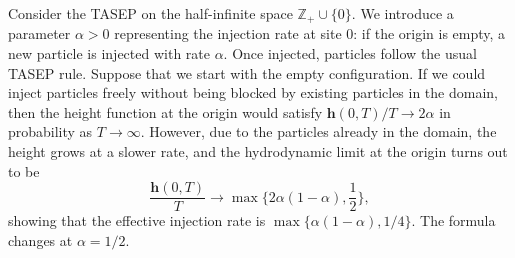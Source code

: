 \documentclass[10pt]{article}
\theoremstyle{plain}
\theoremstyle{definition}
\newcommand{\beqq}{ \begin{equation*} }
\newcommand{\eeqq}{ \end{equation*} }
\newcommand{\Z}{\mathbb{Z}}
\newcommand{\kheight}{\mathbf{h}} %
\numberwithin{equation}{section}
\begin{document}

Consider the TASEP on the half-infinite space $\Z_+\cup\{0\}$. 
We introduce a parameter $\alpha>0$ representing the injection rate at site $0$: if the origin is empty, a new particle is injected with rate $\alpha$. Once injected, particles follow the usual TASEP rule. 
Suppose that we start with the empty configuration. 
If we could inject particles freely without being blocked by existing particles in the domain, then the height function at the origin would satisfy $\kheight(0,T)/T\to 2\alpha$ in probability as $T\to \infty$. 
However, due to the particles already in the domain, the height grows at a slower rate, and the hydrodynamic limit at the origin turns out to be 
\beqq
	\frac{\kheight (0, T)}{T} \to \max \big\{ 2\alpha(1-\alpha), \frac{1}{2} \big\}, 
\eeqq
showing that the effective injection rate is $\max\{ \alpha(1-\alpha), 1/4\}$. 
The formula changes at $\alpha=1/2$. 
\end{document}
